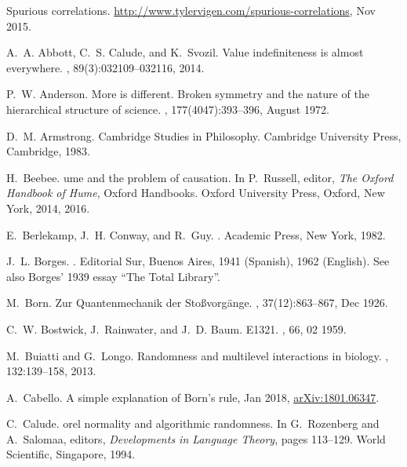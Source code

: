 \documentclass[12pt]{article}
\begin{document}
\begin{thebibliography}{10}

Spurious correlations.
\newblock \url{http://www.tylervigen.com/spurious-correlations}, Nov 2015.

A.~A. Abbott, C.~S. Calude, and K.~Svozil.
\newblock Value indefiniteness is almost everywhere.
, 89(3):032109--032116, 2014.

P.~W. Anderson.
\newblock More is different. {B}roken symmetry and the nature of the
  hierarchical structure of science.
, 177(4047):393--396, August 1972.

D.~M. Armstrong.
\newblock Cambridge Studies in Philosophy. Cambridge University Press,
  Cambridge, 1983.

H.~Beebee.
ume and the problem of causation.
\newblock In P.~Russell, editor, {\em The {O}xford Handbook of Hume}, Oxford
  Handbooks. Oxford University Press, Oxford, New York, 2014, 2016.

E.~Berlekamp, J.~H. Conway, and R.~Guy.
.
\newblock Academic Press, New York, 1982.

J.~L. Borges.
.
\newblock Editorial Sur, Buenos Aires, 1941 (Spanish), 1962 (English).
\newblock See also Borges' 1939 essay ``The Total Library''.

M.~Born.
\newblock Zur {Q}uantenmechanik der {S}to{\ss}vorg{\"{a}}nge.
, 37(12):863--867, Dec 1926.

C.~W. Bostwick, J.~Rainwater, and J.~D. Baum.
\newblock E1321.
, 66, 02 1959.

M.~Buiatti and G.~Longo.
\newblock Randomness and multilevel interactions in biology.
, 132:139--158, 2013.

A.~Cabello.
\newblock A simple explanation of {B}orn's rule, Jan 2018,
\url{arXiv:1801.06347}.

C.~Calude.
orel normality and algorithmic randomness.
\newblock In G.~Rozenberg and A.~Salomaa, editors, {\em Developments in
  Language Theory}, pages 113--129. World Scientific, Singapore, 1994.


\end{thebibliography}
\end{document}
